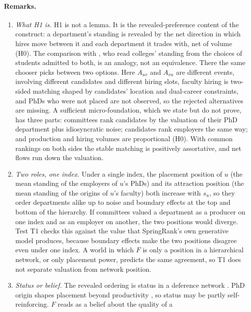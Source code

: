 \paragraph{Remarks.}
\begin{enumerate}
\item \emph{What H1 is.} H1 is not a lemma. It is the revealed-preference content of the construct: a
department's standing is revealed by the net direction in which hires move between it and each department it
trades with, net of volume (H0). The comparison with \citet{avery2013revealed}, who read colleges' standing from
the choices of students admitted to both, is an analogy, not an equivalence. There the same chooser picks between
two options. Here $A_{uv}$ and $A_{vu}$ are different events, involving different candidates and different
hiring slots, faculty hiring is two-sided matching shaped by candidates' location and dual-career constraints,
and PhDs who were not placed are not observed, so the rejected alternatives are missing. A sufficient
micro-foundation, which we state but do not prove, has three parts: committees rank candidates by the valuation of
their PhD department plus idiosyncratic noise; candidates rank employers the same way; and production and hiring
volumes are proportional (H0). With common rankings on both sides the stable matching \citep{gale1962college} is
positively assortative, and net flows run down the valuation.
\item \emph{Two roles, one index.} Under a single index, the placement position of $u$ (the mean standing of the
employers of $u$'s PhDs) and its attraction position (the mean standing of the origins of $u$'s faculty) both
increase with $s_u$, so they order departments alike up to noise and boundary effects at the top and bottom of
the hierarchy. If committees valued a department as a producer on one index and as an employer on another, the two
positions would diverge. Test T1 checks this against the value that SpringRank's own generative model produces,
because boundary effects make the two positions disagree even under one index. A world in which $F$ is only a
position in a hierarchical network, or only placement power, predicts the same agreement, so T1 does not separate
valuation from network position.
\item \emph{Status or belief.} The revealed ordering is status in a deference network
\citep{burris2004academic,podolny1993status,sauder2012status}. PhD origin shapes placement beyond productivity
\citep{long1979entrance}, so status may be partly self-reinforcing. $F$ reads as a belief about the quality of a

\end{enumerate}
